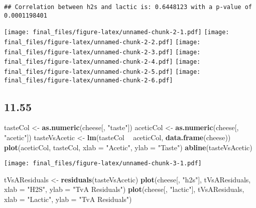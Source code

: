 \documentclass[]{article}
\newenvironment{Shaded}{\begin{snugshade}}{\end{snugshade}}
\newcommand{\DataTypeTok}[1]{\textcolor[rgb]{0.13,0.29,0.53}{#1}}
\newcommand{\KeywordTok}[1]{\textcolor[rgb]{0.13,0.29,0.53}{\textbf{#1}}}
\newcommand{\NormalTok}[1]{#1}
\newcommand{\OperatorTok}[1]{\textcolor[rgb]{0.81,0.36,0.00}{\textbf{#1}}}
\newcommand{\StringTok}[1]{\textcolor[rgb]{0.31,0.60,0.02}{#1}}
\begin{document}
\begin{verbatim}
## Correlation between h2s and lactic is: 0.6448123 with a p-value of 0.0001198401
\end{verbatim}

\texttt{[image: final\_files/figure-latex/unnamed-chunk-2-1.pdf]}
\texttt{[image: final\_files/figure-latex/unnamed-chunk-2-2.pdf]}
\texttt{[image: final\_files/figure-latex/unnamed-chunk-2-3.pdf]}
\texttt{[image: final\_files/figure-latex/unnamed-chunk-2-4.pdf]}
\texttt{[image: final\_files/figure-latex/unnamed-chunk-2-5.pdf]}
\texttt{[image: final\_files/figure-latex/unnamed-chunk-2-6.pdf]}

\hypertarget{section-2}{%
\subsection{11.55}\label{section-2}}

\begin{Shaded}
\begin{Highlighting}[]
\NormalTok{tasteCol <-}\StringTok{ }\KeywordTok{as.numeric}\NormalTok{(cheese[, }\StringTok{"taste"}\NormalTok{])}
\NormalTok{aceticCol <-}\StringTok{ }\KeywordTok{as.numeric}\NormalTok{(cheese[, }\StringTok{"acetic"}\NormalTok{])}
\NormalTok{tasteVsAcetic <-}\StringTok{ }\KeywordTok{lm}\NormalTok{(tasteCol }\OperatorTok{~}\StringTok{ }\NormalTok{aceticCol, }\KeywordTok{data.frame}\NormalTok{(cheese))}
\KeywordTok{plot}\NormalTok{(aceticCol, tasteCol, }\DataTypeTok{xlab =} \StringTok{"Acetic"}\NormalTok{, }\DataTypeTok{ylab =} \StringTok{"Taste"}\NormalTok{)}
\KeywordTok{abline}\NormalTok{(tasteVsAcetic)}
\end{Highlighting}
\end{Shaded}

\texttt{[image: final\_files/figure-latex/unnamed-chunk-3-1.pdf]}

\begin{Shaded}
\begin{Highlighting}[]
\NormalTok{tVsAResiduals <-}\StringTok{ }\KeywordTok{residuals}\NormalTok{(tasteVsAcetic)}
\KeywordTok{plot}\NormalTok{(cheese[, }\StringTok{"h2s"}\NormalTok{], tVsAResiduals, }\DataTypeTok{xlab =} \StringTok{"H2S"}\NormalTok{, }\DataTypeTok{ylab =} \StringTok{"TvA Residuals"}\NormalTok{)}
\KeywordTok{plot}\NormalTok{(cheese[, }\StringTok{"lactic"}\NormalTok{], tVsAResiduals, }\DataTypeTok{xlab =} \StringTok{"Lactic"}\NormalTok{, }\DataTypeTok{ylab =} \StringTok{"TvA Residuals"}\NormalTok{)}
\end{Highlighting}
\end{Shaded}
\end{document}
